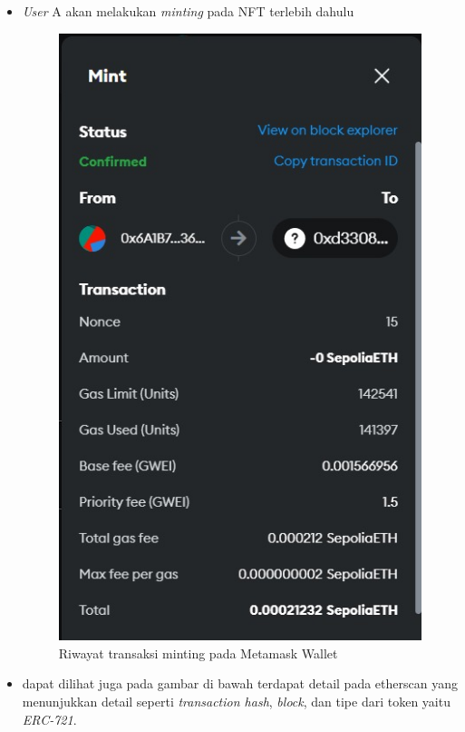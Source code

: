 \begin{itemize}
    \item \emph{User} A akan melakukan \emph{minting} pada NFT terlebih dahulu

    \begin{figure} [H] \centering
    \includegraphics[scale=0.35]{gambar/riwayat_transaksi.jpeg}
    \caption{Riwayat transaksi minting pada Metamask Wallet}
    \label{fig:minting}
    \end{figure}

    \item dapat dilihat juga pada gambar di bawah terdapat detail pada etherscan yang menunjukkan detail seperti \emph{transaction hash}, \emph{block}, dan tipe dari token yaitu \emph{ERC-721}.


\end{itemize}
